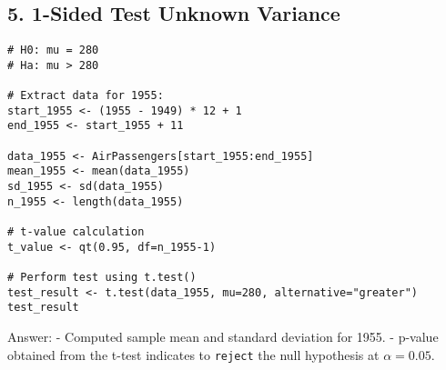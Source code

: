 \documentclass{article}
\begin{document}
\subsection*{5. 1-Sided Test Unknown Variance}
\begin{lstlisting}
# H0: mu = 280
# Ha: mu > 280

# Extract data for 1955:
start_1955 <- (1955 - 1949) * 12 + 1
end_1955 <- start_1955 + 11

data_1955 <- AirPassengers[start_1955:end_1955]
mean_1955 <- mean(data_1955)
sd_1955 <- sd(data_1955)
n_1955 <- length(data_1955)

# t-value calculation
t_value <- qt(0.95, df=n_1955-1)

# Perform test using t.test()
test_result <- t.test(data_1955, mu=280, alternative="greater")
test_result
\end{lstlisting}
Answer:
- Computed sample mean and standard deviation for 1955.
- p-value obtained from the t-test indicates to \texttt{reject} the null hypothesis at $\alpha = 0.05$.
\end{document}
